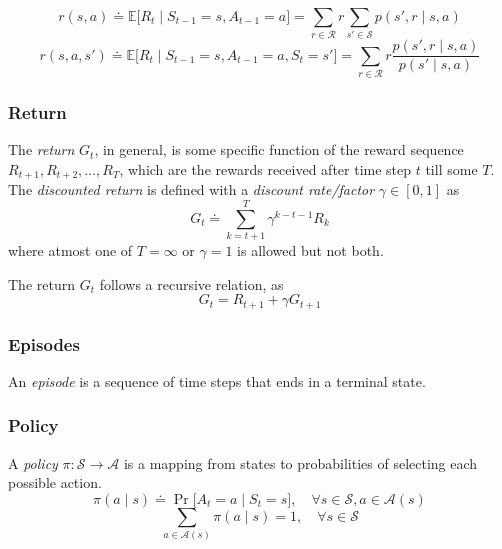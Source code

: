 \begin{equation}
    r(s, a) \doteq \mathbb{E} \big[ R_{t} \mid S_{t-1} = s, A_{t-1} = a \big]
    = \sum_{r \in \mathcal{R}} r \sum_{s' \in \mathcal{S}}  p(s', r \mid s, a)
\end{equation}
\begin{equation}
    r(s, a, s') \doteq \mathbb{E} \big[ R_{t} \mid S_{t-1} = s, A_{t-1} = a, S_{t} = s' \big]
    = \sum_{r \in \mathcal{R}} r \frac{p(s', r \mid s, a)}{p(s' \mid s, a)}
\end{equation}

\subsubsection{Return}

The \textit{return} \( G_t \), in general, is some specific function of the reward sequence \( R_{t+1}, R_{t+2}, \ldots, R_{T} \), which are the rewards received after time step \( t \) till some \( T \).
The \textit{discounted return} is defined with a \textit{discount rate/factor} \( \gamma \in [0, 1] \) as
\begin{equation}
    G_t \doteq \sum_{k=t+1}^{T} \gamma^{k-t-1} R_k
\end{equation}
where atmost one of \( T = \infty \) or \( \gamma = 1 \) is allowed but not both.

The return \( G_t \) follows a recursive relation, as
\begin{equation}
    G_t = R_{t+1} + \gamma G_{t+1}
\end{equation}

\subsubsection{Episodes}

An \textit{episode} is a sequence of time steps that ends in a terminal state.

\subsubsection{Policy}

A \textit{policy} \( \pi: \mathcal{S} \to \mathcal{A} \) is a mapping from states to probabilities of selecting each possible action.
\begin{equation}
    \pi(a \mid s) \doteq \Pr \big[ A_t = a \mid S_t = s \big]
    , \quad \forall s \in \mathcal{S}, a \in \mathcal{A}(s)
\end{equation}
\begin{equation}
    \sum_{a \in \mathcal{A}(s)} \pi(a \mid s) = 1
    , \quad \forall s \in \mathcal{S}
\end{equation}


